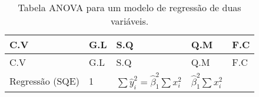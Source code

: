 \documentclass[
  openany]{book}
\begin{document}
\begin{longtable}[]{@{}lllll@{}}
\caption{\label{tab:anovareg} Tabela ANOVA para um modelo de regressão de duas variáveis.}\tabularnewline
\toprule
\begin{minipage}[b]{0.17\columnwidth}\raggedright
C.V\strut
\end{minipage} & \begin{minipage}[b]{0.17\columnwidth}\raggedright
G.L\strut
\end{minipage} & \begin{minipage}[b]{0.17\columnwidth}\raggedright
S.Q\strut
\end{minipage} & \begin{minipage}[b]{0.17\columnwidth}\raggedright
Q.M\strut
\end{minipage} & \begin{minipage}[b]{0.17\columnwidth}\raggedright
F.C\strut
\end{minipage}\tabularnewline
\midrule
\endfirsthead
\toprule
\begin{minipage}[b]{0.17\columnwidth}\raggedright
C.V\strut
\end{minipage} & \begin{minipage}[b]{0.17\columnwidth}\raggedright
G.L\strut
\end{minipage} & \begin{minipage}[b]{0.17\columnwidth}\raggedright
S.Q\strut
\end{minipage} & \begin{minipage}[b]{0.17\columnwidth}\raggedright
Q.M\strut
\end{minipage} & \begin{minipage}[b]{0.17\columnwidth}\raggedright
F.C\strut
\end{minipage}\tabularnewline
\midrule
\endhead
\begin{minipage}[t]{0.17\columnwidth}\raggedright
Regressão (SQE)\strut
\end{minipage} & \begin{minipage}[t]{0.17\columnwidth}\raggedright
1\strut
\end{minipage} & \begin{minipage}[t]{0.17\columnwidth}\raggedright
\(\sum \hat{y}_i^2=\hat{\beta}_1^2 \sum x_i^2\)\strut
\end{minipage} & \begin{minipage}[t]{0.17\columnwidth}\raggedright
\(\hat{\beta}_1^2 \sum x_i^2\)\strut
\end{minipage} & \begin{minipage}[t]{0.17\columnwidth}\raggedright

\end{minipage}
\end{longtable}
\end{document}
